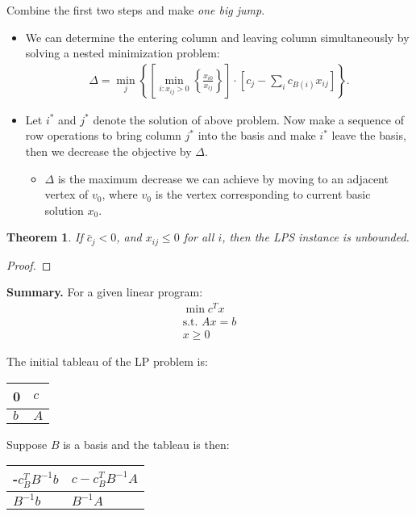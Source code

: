 \documentclass[11pt]{article} %
\theoremstyle{plain}%
\newtheorem{thm}{Theorem}[section]
\theoremstyle{definition}
\theoremstyle{remark}
\begin{document}
Combine the first two steps and make \emph{one big jump}. 
\begin{itemize}
	\item We can determine the entering column and leaving column simultaneously 
	by solving a nested minimization problem: 
	\begin{align*}
	\Delta = 
	\min_j \left\{ \left[ \min_{i:x_{ij}>0} \left\{ \frac{x_{i0}}{x_{ij}}\right\} \right]
	\cdot \left[ c_j - \sum_i c_{B(i)} x_{ij}\right] \right\}. 
	\end{align*}
	\item Let $i^*$ and $j^*$ denote the solution of above problem. 
	Now make a sequence of row operations to bring column $j^*$ into the basis 
	and make $i^*$ leave the basis, then we decrease the objective by $\Delta$. 
	\begin{itemize}
		\item $\Delta$ is the maximum decrease we can achieve by moving to 
		an adjacent vertex of $v_0$, where $v_0$ is the vertex corresponding to 
		current basic solution $x_0$. 
	\end{itemize}
\end{itemize}

\begin{thm}
If $\bar{c}_j < 0$, and $x_{ij} \leq 0$ for all $i$, then the LPS instance is unbounded. 
\end{thm}

\begin{proof}

\end{proof}

\textbf{Summary.} For a given linear program: 
\begin{align*}
\min c^T x\\
\text{s.t. } Ax = b\\
x \geq 0
\end{align*}

The initial tableau of the LP problem is: 
\begin{center}
\begin{tabular}{|l|l|}
\hline
0 & $c$ \\
\hline
$b$ & $A$ \\
\hline
\end{tabular}
\end{center}

Suppose $B$ is a basis and the tableau is then: 
\begin{center}
\begin{tabular}{|l|l|}
\hline
-$c_B^T B^{-1} b$ & $c - c_B^T B^{-1} A$ \\
\hline
$B^{-1} b$ & $B^{-1} A$ \\
\hline
\end{tabular}
\end{center}
\end{document}
